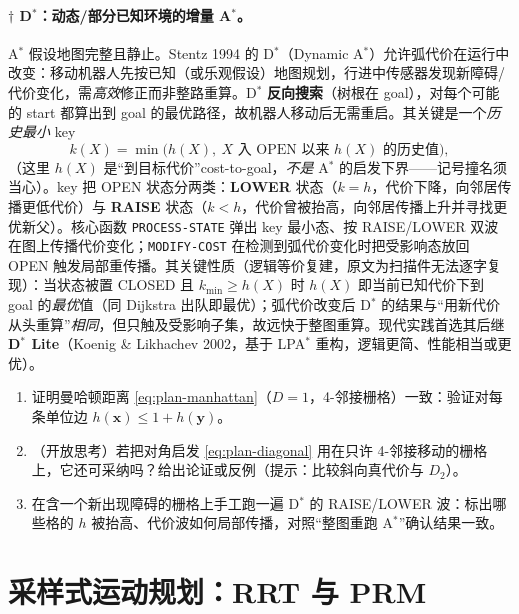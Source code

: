 \paragraph{$\dagger$ D$^*$：动态/部分已知环境的增量 A$^*$。}\rebuilt
A$^*$ 假设地图完整且静止。Stentz 1994 的 D$^*$（Dynamic A$^*$）允许弧代价在运行中改变\cite{stentz1994optimal}：移动机器人先按已知（或乐观假设）地图规划，行进中传感器发现新障碍/代价变化，需\emph{高效}修正而非整路重算。D$^*$ \textbf{反向搜索}（树根在 goal），对每个可能的 start 都算出到 goal 的最优路径，故机器人移动后无需重启。其关键是一个\emph{历史最小} key
\begin{equation}
  k(X)=\min\big(h(X),\ X\text{ 入 OPEN 以来 }h(X)\text{ 的历史值}\big),
  \label{eq:plan-dstar-key}
\end{equation}
（这里 $h(X)$ 是“到目标代价”cost-to-goal，\emph{不是} A$^*$ 的启发下界——记号撞名须当心）。key 把 OPEN 状态分两类：\textbf{LOWER} 状态（$k=h$，代价下降，向邻居传播更低代价）与 \textbf{RAISE} 状态（$k<h$，代价曾被抬高，向邻居传播上升并寻找更优新父）。核心函数 \texttt{PROCESS-STATE} 弹出 key 最小态、按 RAISE/LOWER 双波在图上传播代价变化；\texttt{MODIFY-COST} 在检测到弧代价变化时把受影响态放回 OPEN 触发局部重传播。其关键性质（逻辑等价复建，原文为扫描件无法逐字复现）：当状态被置 CLOSED 且 $k_{\min}\ge h(X)$ 时 $h(X)$ 即当前已知代价下到 goal 的\emph{最优}值（同 Dijkstra 出队即最优）；弧代价改变后 D$^*$ 的结果与“用新代价从头重算”\emph{相同}，但只触及受影响子集，故远快于整图重算。现代实践首选其后继 \textbf{D$^*$ Lite}（Koenig \& Likhachev 2002，基于 LPA$^*$ 重构，逻辑更简、性能相当或更优）。

\begin{practice}
\begin{enumerate}
  \item 证明曼哈顿距离 \cref{eq:plan-manhattan}（$D=1$，4-邻接栅格）一致：验证对每条单位边 $h(\mathbf{x})\le1+h(\mathbf{y})$。
  \item （开放思考）若把对角启发 \cref{eq:plan-diagonal} 用在只许 4-邻接移动的栅格上，它还可采纳吗？给出论证或反例（提示：比较斜向真代价与 $D_2$）。
  \item 在含一个新出现障碍的栅格上手工跑一遍 D$^*$ 的 RAISE/LOWER 波：标出哪些格的 $h$ 被抬高、代价波如何局部传播，对照“整图重跑 A$^*$”确认结果一致。
\end{enumerate}
\end{practice}

\section{采样式运动规划：RRT 与 PRM}
\label{sec:plan-sampling}

